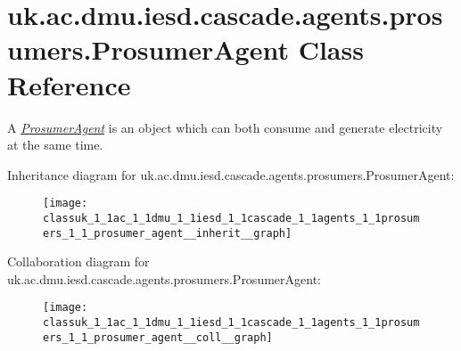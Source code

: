 \hypertarget{classuk_1_1ac_1_1dmu_1_1iesd_1_1cascade_1_1agents_1_1prosumers_1_1_prosumer_agent}{\section{uk.\-ac.\-dmu.\-iesd.\-cascade.\-agents.\-prosumers.\-Prosumer\-Agent Class Reference}
\label{classuk_1_1ac_1_1dmu_1_1iesd_1_1cascade_1_1agents_1_1prosumers_1_1_prosumer_agent}
}


A {\itshape \hyperlink{classuk_1_1ac_1_1dmu_1_1iesd_1_1cascade_1_1agents_1_1prosumers_1_1_prosumer_agent}{Prosumer\-Agent}} is an object which can both consume and generate electricity at the same time.  




Inheritance diagram for uk.\-ac.\-dmu.\-iesd.\-cascade.\-agents.\-prosumers.\-Prosumer\-Agent\-:\nopagebreak
\begin{figure}[H]
\begin{center}
\leavevmode
\texttt{[image: classuk\_1\_1ac\_1\_1dmu\_1\_1iesd\_1\_1cascade\_1\_1agents\_1\_1prosumers\_1\_1\_prosumer\_agent\_\_inherit\_\_graph]}
\end{center}
\end{figure}


Collaboration diagram for uk.\-ac.\-dmu.\-iesd.\-cascade.\-agents.\-prosumers.\-Prosumer\-Agent\-:\nopagebreak
\begin{figure}[H]
\begin{center}
\leavevmode
\texttt{[image: classuk\_1\_1ac\_1\_1dmu\_1\_1iesd\_1\_1cascade\_1\_1agents\_1\_1prosumers\_1\_1\_prosumer\_agent\_\_coll\_\_graph]}
\end{center}
\end{figure}
